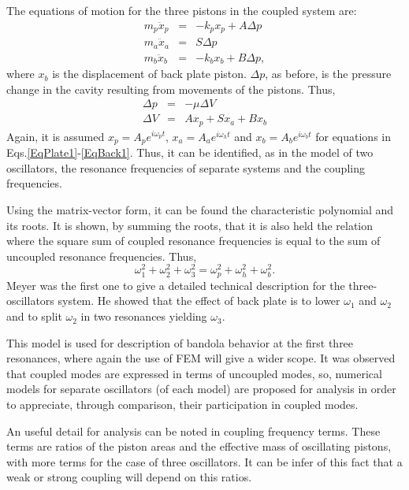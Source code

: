 The equations of motion for the three pistons in the coupled system are:
\begin{eqnarray}
m_{p}\ddot{x}_p & = & - k_p x_p  + A \Delta p
\label{EqPlate1}\\
m_{a}\ddot{x}_a & = & S \Delta p
\label{EqAir1}\\
m_{b}\ddot{x}_b & = & - k_b x_b  + B \Delta p,
\label{EqBack1}
\end{eqnarray}
where $x_b$ is the displacement of back plate piston.
$\Delta p$, as before, is the pressure change in the cavity resulting from movements of the pistons. Thus,
\begin{eqnarray*}
\Delta p & = & -\mu \Delta V\\
\Delta V & = & A x_p + S x_a + B x_b
\end{eqnarray*}
Again, it is assumed $x_p=A_p e^{i\omega_p t}$, $x_a=A_a e^{i\omega_h t}$ and $x_b=A_b e^{i\omega_b t}$ for equations in Eqs.\ref{EqPlate1}-\ref{EqBack1}. Thus, it can be identified, as in the model of two oscillators, the resonance frequencies of separate systems and the coupling frequencies.

Using the matrix-vector form, it can be found the characteristic polynomial and its roots. It is shown, by summing the roots, that it is also held the relation where the square sum of coupled resonance frequencies is equal to the sum of uncoupled resonance frequencies. Thus,
\begin{equation}
\omega_{1}^2 + \omega_{2}^2 + \omega_{3}^2 = \omega^2_p + \omega^2_h + \omega^2_b.
\label{Combination3}
\end{equation}
Meyer \cite{Meyer2} was the first one to give a detailed technical description for the three-oscillators system. He showed that the effect of back plate is to lower $\omega_1$ and $\omega_2$ and to split $\omega_2$ in two resonances yielding $\omega_3$.

This model is used for description of bandola behavior at the first three resonances, where again the use of FEM will give a wider scope. It was observed that coupled modes are expressed in terms of uncoupled modes, so, numerical models for separate oscillators (of each model) are proposed for analysis in order to appreciate, through comparison, their participation in coupled modes.

An useful detail for analysis can be noted in coupling frequency terms. These terms are ratios of the piston areas and the effective mass of oscillating pistons, with more terms for the case of three oscillators. It can be infer of this fact that a weak or strong coupling will depend on this ratios.